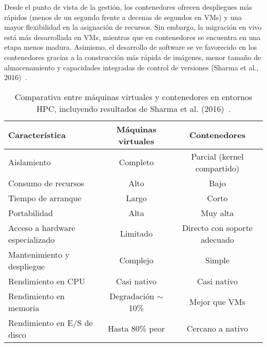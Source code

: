 Desde el punto de vista de la gestión, los contenedores ofrecen despliegues más rápidos (menos de un segundo frente a decenas de segundos en VMs) y una mayor flexibilidad en la asignación de recursos. Sin embargo, la migración en vivo está más desarrollada en VMs, mientras que en contenedores se encuentra en una etapa menos madura. Asimismo, el desarrollo de software se ve favorecido en los contenedores gracias a la construcción más rápida de imágenes, menor tamaño de almacenamiento y capacidades integradas de control de versiones (Sharma et al., 2016)~\cite{sharma2016containers}.

\begin{table}[ht]
    \centering
    \begin{tabular}{lcc}
        \toprule
        \textbf{Característica}         & \textbf{Máquinas virtuales} & \textbf{Contenedores}        \\
        \midrule
        Aislamiento                     & Completo                    & Parcial (kernel compartido)  \\
        Consumo de recursos             & Alto                        & Bajo                         \\
        Tiempo de arranque              & Largo                       & Corto                        \\
        Portabilidad                    & Alta                        & Muy alta                     \\
        Acceso a hardware especializado & Limitado                    & Directo con soporte adecuado \\
        Mantenimiento y despliegue      & Complejo                    & Simple                       \\
        Rendimiento en CPU              & Casi nativo                 & Casi nativo                  \\
        Rendimiento en memoria          & Degradación $\sim$10\%      & Mejor que VMs                \\
        Rendimiento en E/S de disco     & Hasta 80\% peor             & Cercano a nativo             \\
        \bottomrule
    \end{tabular}
    \caption{Comparativa entre máquinas virtuales y contenedores en entornos HPC, incluyendo resultados de Sharma et al. (2016)~\cite{sharma2016containers}.}
    \label{tab:vm_vs_container}
\end{table}

